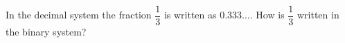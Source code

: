 In the decimal system the fraction $\dfrac{1}{3}$ is written as $0.333\ldots$. How is $\dfrac{1}{3}$ written in the binary system?
